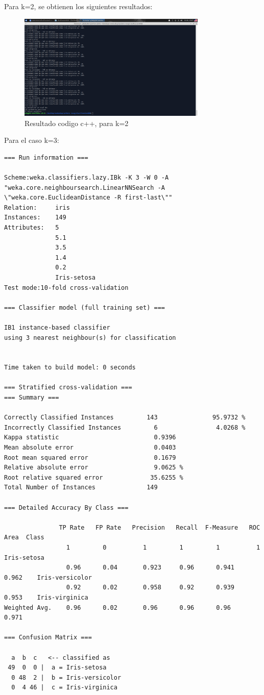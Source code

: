 \documentclass[12pt,letterpaper]{article}
\begin{document}
Para k=2, se obtienen los siguientes resultados:

\begin{figure}[H]
    \centering
    \includegraphics[width=0.8\textwidth]{knnc++2.jpg}
    \caption{Resultado codigo c++, para k=2}
    \label{fig:2}
\end{figure}

Para el caso k=3:

\begin{lstlisting}
=== Run information ===

Scheme:weka.classifiers.lazy.IBk -K 3 -W 0 -A "weka.core.neighboursearch.LinearNNSearch -A \"weka.core.EuclideanDistance -R first-last\""
Relation:     iris
Instances:    149
Attributes:   5
              5.1
              3.5
              1.4
              0.2
              Iris-setosa
Test mode:10-fold cross-validation

=== Classifier model (full training set) ===

IB1 instance-based classifier
using 3 nearest neighbour(s) for classification


Time taken to build model: 0 seconds

=== Stratified cross-validation ===
=== Summary ===

Correctly Classified Instances         143               95.9732 %
Incorrectly Classified Instances         6                4.0268 %
Kappa statistic                          0.9396
Mean absolute error                      0.0403
Root mean squared error                  0.1679
Relative absolute error                  9.0625 %
Root relative squared error             35.6255 %
Total Number of Instances              149     

=== Detailed Accuracy By Class ===

               TP Rate   FP Rate   Precision   Recall  F-Measure   ROC Area  Class
                 1         0          1         1         1          1        Iris-setosa
                 0.96      0.04       0.923     0.96      0.941      0.962    Iris-versicolor
                 0.92      0.02       0.958     0.92      0.939      0.953    Iris-virginica
Weighted Avg.    0.96      0.02       0.96      0.96      0.96       0.971

=== Confusion Matrix ===

  a  b  c   <-- classified as
 49  0  0 |  a = Iris-setosa
  0 48  2 |  b = Iris-versicolor
  0  4 46 |  c = Iris-virginica
\end{lstlisting}
\end{document}
